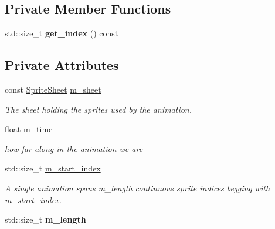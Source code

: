 \subsection*{Private Member Functions}
\begin{DoxyCompactItemize}
\item 
\mbox{\label{classnta_1_1Animation2D_ac446522438b03f14a532907ba5c3d5af}} 
std\+::size\+\_\+t {\bfseries get\+\_\+index} () const
\end{DoxyCompactItemize}
\subsection*{Private Attributes}
\begin{DoxyCompactItemize}
\item 
\mbox{\label{classnta_1_1Animation2D_a71e58384ae4483c1ca43e0583887a21d}} 
const \hyperlink{structnta_1_1SpriteSheet}{Sprite\+Sheet} \hyperlink{classnta_1_1Animation2D_a71e58384ae4483c1ca43e0583887a21d}{m\+\_\+sheet}
\begin{DoxyCompactList}\small\item\em The sheet holding the sprites used by the animation. \end{DoxyCompactList}\item 
\mbox{\label{classnta_1_1Animation2D_a24497412429334fe270a1b0ba6526203}} 
float \hyperlink{classnta_1_1Animation2D_a24497412429334fe270a1b0ba6526203}{m\+\_\+time}
\begin{DoxyCompactList}\small\item\em how far along in the animation we are \end{DoxyCompactList}\item 
\mbox{\label{classnta_1_1Animation2D_a61cdaf3599067dc1e2fe3b926b29b838}} 
std\+::size\+\_\+t \hyperlink{classnta_1_1Animation2D_a61cdaf3599067dc1e2fe3b926b29b838}{m\+\_\+start\+\_\+index}
\begin{DoxyCompactList}\small\item\em A single animation spans m\+\_\+length continuous sprite indices begging with m\+\_\+start\+\_\+index. \end{DoxyCompactList}\item 
\mbox{\label{classnta_1_1Animation2D_a7ad254603c0e4c081895989643f6aa9e}} 
std\+::size\+\_\+t {\bfseries m\+\_\+length}
\end{DoxyCompactItemize}


